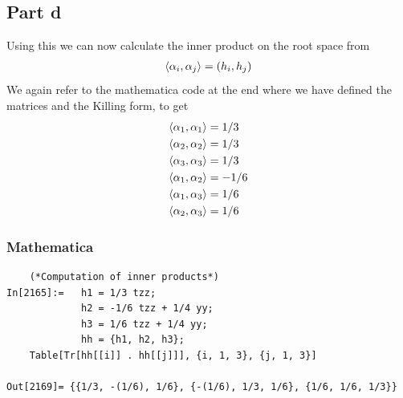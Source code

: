 \documentclass[a4paper,12pt]{article}
\begin{document}
\subsection*{Part d}
Using this we can now calculate the inner product on the root space from
\begin{equation}
	\begin{aligned}
		\expval{\alpha_i,\alpha_j}=(h_i,h_j)
	\end{aligned}
\end{equation}
We again refer to the mathematica code at the end where we have defined the matrices and the Killing form, to get 
\begin{equation}
	\begin{aligned}
		\expval{\alpha_1,\alpha_1}&=1/3\\
		\expval{\alpha_2,\alpha_2}&=1/3\\
		\expval{\alpha_3,\alpha_3}&=1/3\\
		\expval{\alpha_1,\alpha_2}&=-1/6\\
		\expval{\alpha_1,\alpha_3}&=1/6\\
		\expval{\alpha_2,\alpha_3}&=1/6\\
	\end{aligned}
\end{equation}
\subsubsection*{Mathematica}
\begin{lstlisting}
	(*Computation of inner products*)
In[2165]:=	 h1 = 1/3 tzz;
			 h2 = -1/6 tzz + 1/4 yy;
   			 h3 = 1/6 tzz + 1/4 yy;
			 hh = {h1, h2, h3};
	Table[Tr[hh[[i]] . hh[[j]]], {i, 1, 3}, {j, 1, 3}]

Out[2169]= {{1/3, -(1/6), 1/6}, {-(1/6), 1/3, 1/6}, {1/6, 1/6, 1/3}}
\end{lstlisting}
\end{document}

